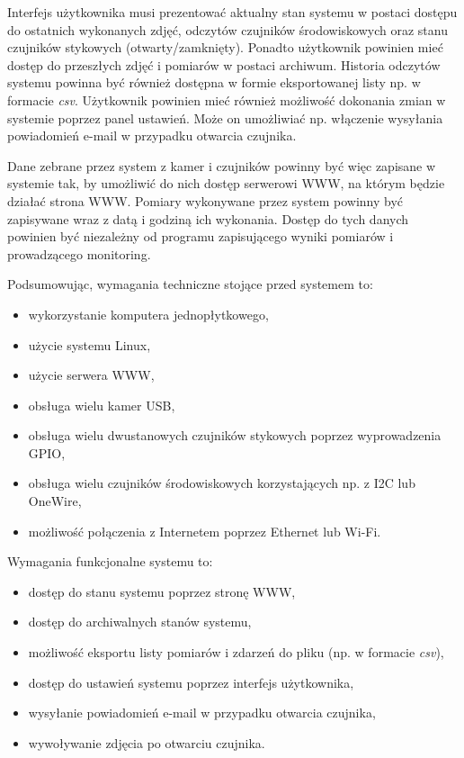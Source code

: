 \documentclass[a4paper,12pt,twoside]{article}
\begin{document}
Interfejs użytkownika musi prezentować aktualny stan systemu w postaci dostępu do ostatnich wykonanych zdjęć, odczytów czujników środowiskowych oraz stanu czujników stykowych (otwarty/zamknięty). Ponadto użytkownik powinien mieć dostęp do przeszłych zdjęć i pomiarów w postaci archiwum. Historia odczytów systemu powinna być również dostępna w formie eksportowanej listy np. w formacie \textit{csv}. Użytkownik powinien mieć również możliwość dokonania zmian w systemie poprzez panel ustawień. Może on umożliwiać np. włączenie wysyłania powiadomień e-mail w przypadku otwarcia czujnika.

Dane zebrane przez system z kamer i czujników powinny być więc zapisane w systemie tak, by umożliwić do nich dostęp serwerowi WWW, na którym będzie działać strona WWW. Pomiary wykonywane przez system powinny być zapisywane wraz z datą i godziną ich wykonania. Dostęp do tych danych powinien być niezależny od programu zapisującego wyniki pomiarów i prowadzącego monitoring.

Podsumowując, wymagania techniczne stojące przed systemem to:
\begin{itemize}
\item wykorzystanie komputera jednopłytkowego,
\item użycie systemu Linux,
\item użycie serwera WWW,
\item obsługa wielu kamer USB,
\item obsługa wielu dwustanowych czujników stykowych poprzez wyprowadzenia GPIO,
\item obsługa wielu czujników środowiskowych korzystających np. z I2C lub OneWire,
\item możliwość połączenia z Internetem poprzez Ethernet lub Wi-Fi.
\end{itemize}

Wymagania funkcjonalne systemu to:
\begin{itemize}
\item dostęp do stanu systemu poprzez stronę WWW,
\item dostęp do archiwalnych stanów systemu,
\item możliwość eksportu listy pomiarów i zdarzeń do pliku (np. w formacie \textit{csv}),
\item dostęp do ustawień systemu poprzez interfejs użytkownika,
\item wysyłanie powiadomień e-mail w przypadku otwarcia czujnika,
\item wywoływanie zdjęcia po otwarciu czujnika.
\end{itemize}
 
\end{document}
